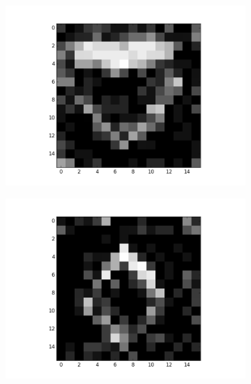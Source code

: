 \begin{figure}[h!]
	
	\begin{subfigure}{.25\textwidth}
  		\centering
  		\includegraphics[width=\linewidth]{imgs/poker/recon_img2.png}
  		\label{fig:sub1}
	\end{subfigure}%
	\begin{subfigure}{.25\textwidth}
  		\centering
  		\includegraphics[width=\linewidth]{imgs/poker/recon_img4.png}
  		\label{fig:sub1}
	\end{subfigure}%
	\begin{subfigure}{.25\textwidth}
  		\centering

\end{subfigure}
\end{figure}
